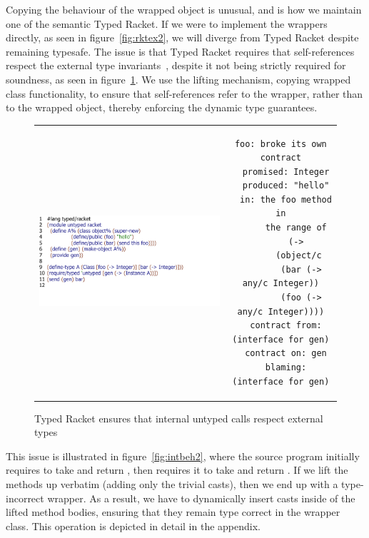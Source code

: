 \documentclass[acmlarge, anonymous, authordraft]{acmart}
\begin{document}
Copying the behaviour of the wrapped object is unusual, and is how we
maintain one of the semantic Typed Racket. If we were to implement the
wrappers directly, as seen in figure~\ref{fig:rktex2}, we will diverge from
Typed Racket despite remaining typesafe. The issue is that Typed Racket
requires that self-references respect the external type
invariants~\cite{Takikawa:2012}, despite it not being strictly required for
soundness, as seen in figure~\ref{fig:arktex3}. We use the lifting
mechanism, copying wrapped class functionality, to ensure that
self-references refer to the wrapper, rather than to the wrapped object,
thereby enforcing the dynamic type guarantees.

\begin{figure}
\begin{tabular}{cc}
\includegraphics[scale=.7]{../figures/internal.pdf}&\hspace{-2cm}
\begin{minipage}{.5\textwidth}
\vspace{-4.3cm}
\tiny
\begin{lstlisting}[basicstyle=\scriptsize\ttfamily]
foo: broke its own contract
  promised: Integer
  produced: "hello"
  in: the foo method in
      the range of
      (->
       (object/c
        (bar (-> any/c Integer))
        (foo (-> any/c Integer))))
  contract from: (interface for gen)
  contract on: gen
  blaming: (interface for gen)
\end{lstlisting}
\end{minipage}
\end{tabular}
\caption{Typed Racket ensures that internal untyped calls respect external types}
\label{fig:arktex3}
\end{figure}

This issue is illustrated in figure~\ref{fig:intbeh2}, where the source program
initially requires \n to take  and return , then requires it to take
and return . If we lift the methods up verbatim (adding only the trivial
casts), then we end up with a type-incorrect wrapper. As a result, we have to
dynamically insert casts inside of the lifted method bodies, ensuring that they
remain type correct in the wrapper class. This operation is depicted in detail
in the appendix.
\end{document}
